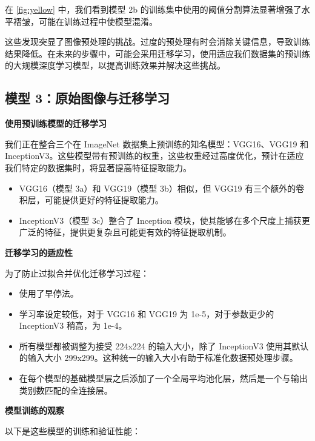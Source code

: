 在 \autoref{fig:yellow} 中，我们看到模型 2b 的训练集中使用的阈值分割算法显著增强了水平褶皱，可能在训练过程中使模型混淆。

这些发现突显了图像预处理的挑战。过度的预处理有时会消除关键信息，导致训练结果降低。在未来的步骤中，可能会采用迁移学习，使用适应我们数据集的预训练的大规模深度学习模型，以提高训练效果并解决这些挑战。

\subsection{模型 3：原始图像与迁移学习}

\textbf{使用预训练模型的迁移学习}

我们正在整合三个在 ImageNet 数据集上预训练的知名模型：VGG16、VGG19 和 InceptionV3。这些模型带有预训练的权重，这些权重经过高度优化，预计在适应我们特定的数据集时，将显著提高特征提取能力。

\begin{itemize}
    \item VGG16（模型 3a）和 VGG19（模型 3b）相似，但 VGG19 有三个额外的卷积层，可能提供更好的特征提取能力。
    \item InceptionV3（模型 3c）整合了 Inception 模块，使其能够在多个尺度上捕获更广泛的特征，提供更复杂且可能更有效的特征提取机制。
\end{itemize}

\textbf{迁移学习的适应性}

为了防止过拟合并优化迁移学习过程：

\begin{itemize}
    \item 使用了早停法。
    \item 学习率设定较低，对于 VGG16 和 VGG19 为 1e-5，对于参数更少的 InceptionV3 稍高，为 1e-4。
    \item 所有模型都被调整为接受 224x224 的输入大小，除了 InceptionV3 使用其默认的输入大小 299x299。这种统一的输入大小有助于标准化数据预处理步骤。
    \item 在每个模型的基础模型层之后添加了一个全局平均池化层，然后是一个与输出类别数匹配的全连接层。
\end{itemize}

\textbf{模型训练的观察}

以下是这些模型的训练和验证性能：

